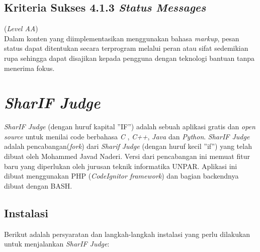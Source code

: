 \subsection{Kriteria Sukses 4.1.3 \textit{Status Messages}}
\label{subsec:kriteria_4.1.3}
(\textit{Level AA}) \\

Dalam konten yang diimplementasikan menggunakan bahasa \textit{markup}, pesan status dapat ditentukan secara terprogram melalui peran atau sifat sedemikian rupa sehingga dapat disajikan kepada pengguna dengan teknologi bantuan tanpa menerima fokus.

\section{\textit{SharIF Judge}}
\label{sec:SharIF_Judge}
\textit{SharIF Judge} \cite{SharIF_Judge} (dengan huruf kapital ''IF'') adalah sebuah aplikasi gratis dan \textit{open source} untuk menilai code berbahasa \textit{C} , \textit{C++}, \textit{Java} dan \textit{Python}. \textit{SharIF Judge} adalah pencabangan(\textit{fork}) dari \textit{Sharif Judge} \cite{Sharif_Judge_Original} (dengan huruf kecil ''if'') yang telah dibuat oleh Mohammed Javad Naderi. Versi dari pencabangan ini memuat fitur baru yang diperlukan oleh jurusan teknik informatika UNPAR. Aplikasi ini dibuat menggunakan PHP (\textit{CodeIgnitor framework})\cite{Codeigniter} dan bagian backendnya dibuat dengan BASH.

\subsection{Instalasi}
\label{subsec:instalasi}
Berikut adalah persyaratan dan langkah-langkah instalasi yang perlu dilakukan untuk menjalankan \textit{SharIF Judge}:

